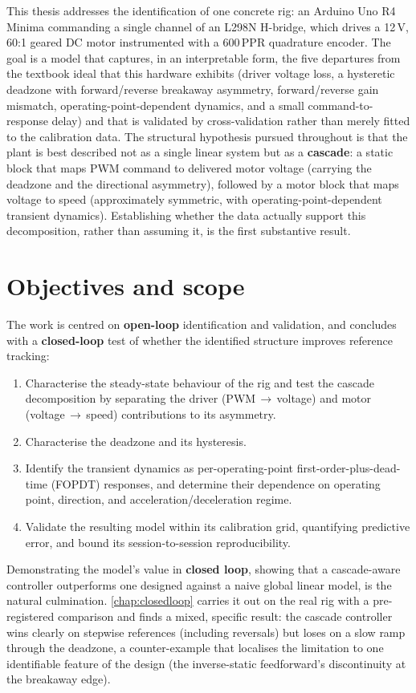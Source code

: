 This thesis addresses the identification of one concrete rig: an Arduino Uno R4 Minima commanding a single channel of an L298N H-bridge, which drives a 12\,V, 60:1 geared DC motor instrumented with a 600\,PPR quadrature encoder. The goal is a model that captures, in an interpretable form, the five departures from the textbook ideal that this hardware exhibits (driver voltage loss, a hysteretic deadzone with forward/reverse breakaway asymmetry, forward/reverse gain mismatch, operating-point-dependent dynamics, and a small command-to-response delay) and that is validated by cross-validation rather than merely fitted to the calibration data. The structural hypothesis pursued throughout is that the plant is best described not as a single linear system but as a \textbf{cascade}: a static block that maps PWM command to delivered motor voltage (carrying the deadzone and the directional asymmetry), followed by a motor block that maps voltage to speed (approximately symmetric, with operating-point-dependent transient dynamics). Establishing whether the data actually support this decomposition, rather than assuming it, is the first substantive result.

\section{Objectives and scope}

The work is centred on \textbf{open-loop} identification and validation, and concludes with a \textbf{closed-loop} test of whether the identified structure improves reference tracking:
\begin{enumerate}
  \item Characterise the steady-state behaviour of the rig and test the cascade decomposition by separating the driver (PWM\,$\to$\,voltage) and motor (voltage\,$\to$\,speed) contributions to its asymmetry.
  \item Characterise the deadzone and its hysteresis.
  \item Identify the transient dynamics as per-operating-point first-order-plus-dead-time (FOPDT) responses, and determine their dependence on operating point, direction, and acceleration/deceleration regime.
  \item Validate the resulting model within its calibration grid, quantifying predictive error, and bound its session-to-session reproducibility.
\end{enumerate}

Demonstrating the model's value in \textbf{closed loop}, showing that a cascade-aware controller outperforms one designed against a naive global linear model, is the natural culmination. \cref{chap:closedloop} carries it out on the real rig with a pre-registered comparison and finds a mixed, specific result: the cascade controller wins clearly on stepwise references (including reversals) but loses on a slow ramp through the deadzone, a counter-example that localises the limitation to one identifiable feature of the design (the inverse-static feedforward's discontinuity at the breakaway edge).

